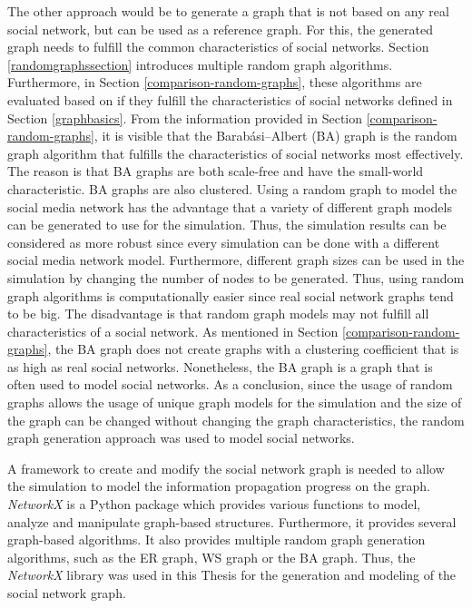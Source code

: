 The other approach would be to generate a graph that is not based
on any real social network, but can be used as a reference graph.
For this, the generated graph needs to fulfill the common
characteristics of social networks.
Section \ref{randomgraphssection} introduces multiple random graph algorithms.
Furthermore, in Section \ref{comparison-random-graphs},
these algorithms are evaluated based on if they fulfill the characteristics
of social networks defined in Section \ref{graphbasics}. 
From the information provided in Section \ref{comparison-random-graphs}, 
it is visible that the Barabási–Albert (BA) graph is the random graph 
algorithm that fulfills the characteristics of social networks most effectively.
The reason is that  BA graphs are both scale-free and have the small-world
characteristic. BA graphs are also clustered.
Using a random graph to model the social media network has the advantage
that a variety of different graph models can be generated to use for 
the simulation. Thus, the simulation results can be considered as more 
robust since every simulation can be done with a different 
social media network model. Furthermore, different graph sizes can be 
used in the simulation by changing the number of nodes to be generated.
Thus, using random graph algorithms is computationally easier since 
real social network graphs tend to be big.
The disadvantage is that random graph models may not fulfill
all characteristics of a social network. As mentioned in 
Section \ref{comparison-random-graphs}, the BA graph
does not create graphs with a clustering coefficient that is as 
high as real social networks. Nonetheless, the BA graph is
a graph that is often used to model social networks.
As a conclusion, since the usage of random graphs allows the usage
of unique graph models for the simulation and the size of the 
graph can be changed without changing the graph characteristics, 
the random graph generation approach was used to model social networks.

A framework to create and modify the social network graph is needed to 
allow the simulation to model the information propagation
progress on the graph. \textit{NetworkX} is a 
Python package which provides various functions to model,
analyze and manipulate graph-based structures. 
Furthermore, it provides several graph-based algorithms.
It also provides multiple random graph generation algorithms,
such as the ER graph, WS graph or the BA graph. 
Thus, the \textit{NetworkX} library was used in this Thesis for
the generation and modeling of the social network graph.

